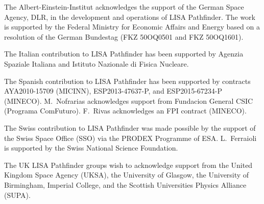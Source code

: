 \documentclass[preprint, trackchanges]{aastex61}
\begin{document}
The Albert-Einstein-Institut acknowledges the support of the German Space Agency,
DLR, in the development and operations of LISA Pathfinder. The work is supported by the Federal Ministry for Economic Affairs and Energy
based on a resolution of the German Bundestag (FKZ 50OQ0501 and FKZ 50OQ1601). 

The Italian contribution to LISA Pathfinder has been supported  by Agenzia Spaziale Italiana and Istituto
Nazionale di Fisica Nucleare.

The Spanish contribution to LISA Pathfinder has been supported by contracts AYA2010-15709 (MICINN),
ESP2013-47637-P, and ESP2015-67234-P (MINECO). M.~Nofrarias acknowledges support from
Fundacion General CSIC (Programa ComFuturo). F.~Rivas acknowledges an FPI contract
(MINECO).

The Swiss contribution to LISA Pathfinder was made possible by the support of the Swiss Space Office (SSO)
via the PRODEX Programme of ESA. L.~Ferraioli is supported by the Swiss National
Science Foundation.

The UK LISA Pathfinder groups wish to acknowledge support from the United Kingdom Space Agency
(UKSA), the University of Glasgow, the University of Birmingham, Imperial College,
and the Scottish Universities Physics Alliance (SUPA).

%

\vspace{5mm}



\end{document}
